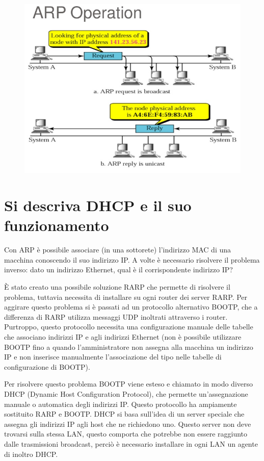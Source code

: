 \begin{figure}[H]
\centering
\includegraphics[scale=0.6]{res/img/43_ARP.png}
\end{figure}

\section{Si descriva DHCP e il suo funzionamento}

Con ARP è possibile associare (in una sottorete) l’indirizzo MAC di una macchina conoscendo il suo indirizzo IP.
A volte è necessario risolvere il problema inverso: dato un indirizzo Ethernet, qual è il corrispondente indirizzo IP?

È stato creato una possibile soluzione RARP che permette di risolvere il problema, tuttavia necessita di installare su ogni router dei server RARP. Per aggirare questo problema si è passati ad un protocollo alternativo BOOTP, che a differenza di RARP utilizza messaggi UDP inoltrati attraverso i router. Purtroppo, questo protocollo necessita una configurazione manuale delle tabelle che associano indirizzi IP e agli indirizzi Ethernet (non è possibile utilizzare BOOTP fino a quando l’amministratore non assegna alla macchina un indirizzo IP e non inserisce manualmente l’associazione del tipo nelle tabelle di configurazione di BOOTP).

Per risolvere questo problema BOOTP viene esteso e chiamato in modo diverso DHCP (Dynamic Host Configuration Protocol), che permette un’assegnazione manuale o automatica degli indirizzi IP.
Questo protocollo ha ampiamente sostituito RARP e BOOTP.
DHCP si basa sull’idea di un server speciale che assegna gli indirizzi IP agli host che ne richiedono uno.
Questo server non deve trovarsi sulla stessa LAN, questo comporta che potrebbe non essere raggiunto dalle trasmissioni broadcast, perciò è necessario installare in ogni LAN un agente di inoltro DHCP.

